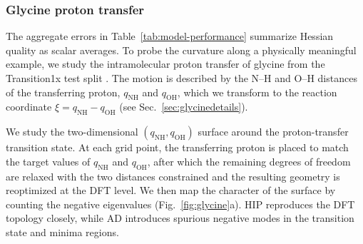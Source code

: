 \documentclass[pdflatex,sn-mathphys-num]{sn-jnl}%
\theoremstyle{thmstyleone}%
\theoremstyle{thmstyletwo}%
\theoremstyle{thmstylethree}%
\begin{document}
\subsubsection{Glycine proton transfer}
% 
The aggregate errors in Table~\ref{tab:model-performance} summarize Hessian quality as scalar averages. To probe the curvature along a physically meaningful example, we study the intramolecular proton transfer of glycine from the Transition1x test split \cite{schreiner2022transition1x}. The motion is described by the N--H and O--H distances of the transferring proton, \(q_{\mathrm{NH}}\) and \(q_{\mathrm{OH}}\), which we transform to the reaction coordinate \(\xi=q_{\mathrm{NH}}-q_{\mathrm{OH}}\) (see Sec.~\ref{sec:glycinedetails}).

We study the two-dimensional \((q_{\mathrm{NH}}, q_{\mathrm{OH}})\) surface around the proton-transfer transition state. At each grid point, the transferring proton is placed to match the target values of \(q_{\mathrm{NH}}\) and \(q_{\mathrm{OH}}\), after which the remaining degrees of freedom are relaxed with the two distances constrained and the resulting geometry is reoptimized at the DFT level. We then map the character of the surface by counting the negative eigenvalues
(Fig.~\ref{fig:glycine}a). HIP reproduces the DFT topology closely, while AD introduces spurious negative modes in the transition state and minima regions.
\end{document}
